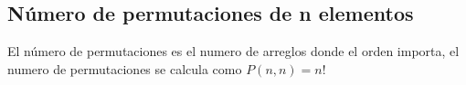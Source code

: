 \subsection{Número de permutaciones de n elementos}
El número de permutaciones es el numero de arreglos donde el orden importa, el numero de permutaciones
se calcula como $P(n,n)=n!$
